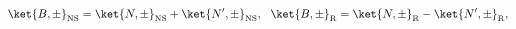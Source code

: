 \begin{equation}
 \ket{B,\pm}_{\rm NS} = \ket{N,\pm}_{\rm NS} +  \ket{N',\pm}_{\rm NS} ,~~
 \ket{B,\pm}_{\rm R} = \ket{N,\pm}_{\rm R} -  \ket{N',\pm}_{\rm R} ,
\end{equation}

